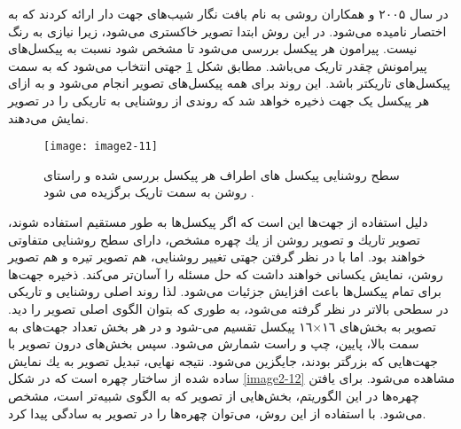 %
%

\noindent
در سال ۲۰۰۵  و همکاران \cite{1467360} روشی به نام بافت نگار شیب‌های جهت دار  ارائه کردند که به اختصار  نامیده می‌شود. در این روش ابتدا تصویر خاکستری می‌شود، زیرا نیازی به رنگ نیست. پیرامون هر پیکسل بررسی می‌شود تا مشخص شود نسبت به پیکسل‌های پیرامونش چقدر تاریک می‌باشد. مطابق شکل \ref{image2-11} جهتی انتخاب می‌شود که به سمت پیکسل‌های تاریکتر باشد. این روند برای همه پیکسل‌های تصویر انجام می‌شود و به ازای هر پیکسل یک جهت ذخیره خواهد شد که روندی از روشنایى به تاریكى را در تصویر نمایش می‌دهند.

\begin{figure}
	\centering
	\texttt{[image: image2-11]}
	\caption{سطح روشنایی پیکسل های اطراف هر پیکسل بررسی شده و راستای روشن به سمت تاریک برگزیده می شود \cite{1467360}.}
	\label{image2-11}
\end{figure}

\noindent
دلیل استفاده از جهت‌ها این است که اگر پیکسل‌ها به طور مستقیم استفاده شوند، تصویر تاریك و تصویر روشن از یك چهره مشخص، دارای سطح روشنایی متفاوتى خواهند بود. اما با در نظر گرفتن جهتى تغییر روشنایى، هم تصویر تیره و هم تصویر روشن، نمایش یكسانى خواهند داشت كه حل مسئله را آسان‌تر می‌كند. ذخیره جهت‌ها براى تمام پیکسل‌ها باعث افزایش جزئیات می‌شود. لذا روند اصلى روشنایى و تاریكى در سطحی بالاتر در نظر گرفته می‌شود، به طورى كه بتوان الگوى اصلى تصویر را دید. تصویر به بخش‌هاى ١٦×١٦ پیكسل تقسیم می-شود و در هر بخش تعداد جهت‌هاى به سمت بالا، پایین، چپ و راست شمارش می‌شود. سپس بخش‌هاى درون تصویر با جهت‌هایى كه بزرگتر بودند، جایگزین می‌شود. نتیجه نهایى، تبدیل تصویر به یك نمایش ساده شده از ساختار چهره است که در شکل \ref{image2-12} مشاهده می‌شود. براى یافتن چهره‌ها در این الگوریتم، بخش‌هایى از تصویر كه به الگوى  شبیه‌تر است، مشخص می‌شود. با استفاده از این روش، می‌توان چهره‌ها را در تصویر به سادگى پیدا كرد.

